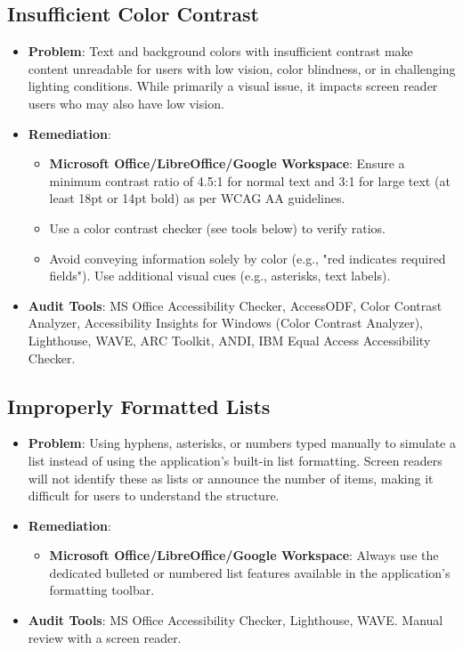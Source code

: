 \subsection{Insufficient Color Contrast}
\label{subsec:color-contrast}
\begin{itemize}
    \item \textbf{Problem}: Text and background colors with insufficient contrast make content unreadable for users with low vision, color blindness, or in challenging lighting conditions. While primarily a visual issue, it impacts screen reader users who may also have low vision.

    \item \textbf{Remediation}:
        \begin{itemize}
            \item \textbf{Microsoft Office/LibreOffice/Google Workspace}: Ensure a minimum contrast ratio of 4.5:1 for normal text and 3:1 for large text (at least 18pt or 14pt bold) as per WCAG AA guidelines.
            \item Use a color contrast checker (see tools below) to verify ratios.
            \item Avoid conveying information solely by color (e.g., "red indicates required fields"). Use additional visual cues (e.g., asterisks, text labels).
        \end{itemize}

    \item \textbf{Audit Tools}: MS Office Accessibility Checker, AccessODF, Color Contrast Analyzer, Accessibility Insights for Windows (Color Contrast Analyzer), Lighthouse, WAVE, ARC Toolkit, ANDI, IBM Equal Access Accessibility Checker.

\end{itemize}

\subsection{Improperly Formatted Lists}
\label{subsec:improper-lists}
\begin{itemize}
    \item \textbf{Problem}: Using hyphens, asterisks, or numbers typed manually to simulate a list instead of using the application's built-in list formatting. Screen readers will not identify these as lists or announce the number of items, making it difficult for users to understand the structure.

    \item \textbf{Remediation}:
        \begin{itemize}
            \item \textbf{Microsoft Office/LibreOffice/Google Workspace}: Always use the dedicated bulleted or numbered list features available in the application's formatting toolbar.
        \end{itemize}

    \item \textbf{Audit Tools}: MS Office Accessibility Checker, Lighthouse, WAVE. Manual review with a screen reader.

\end{itemize}

